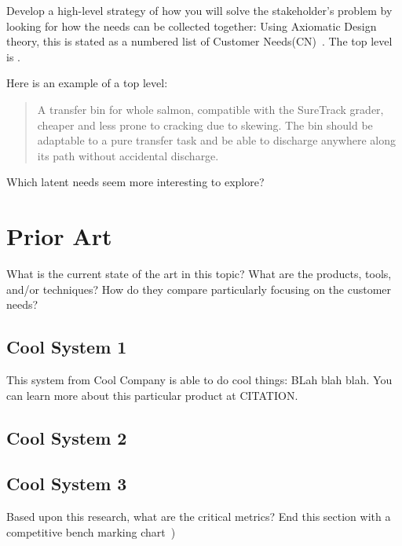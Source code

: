 Develop a high-level strategy of how you will solve the stakeholder's problem by looking for how the needs can be collected together:
Using Axiomatic Design theory, this is stated as a numbered list of Customer Needs(CN)~\cite{suh1990principles}.
The top level is .

Here is an example of a top level:

\begin{quote} \textbf{} A transfer bin for whole salmon, compatible with the SureTrack grader, cheaper and less prone to cracking due to skewing.  
The bin should be adaptable to a pure transfer task and be able to discharge anywhere along its path without
accidental discharge.~\cite{gerhard2016suretrack}
\end{quote}


Which latent needs seem more interesting to explore?

\section{Prior Art}
What is the current state of the art in this topic?
What are the products, tools, and/or techniques?
How do they compare particularly focusing on the customer needs?

\subsection{Cool System 1}
This system from Cool Company is able to do cool things:  BLah blah blah.
You can learn more about this particular product at CITATION.
\subsection{Cool System 2}
\subsection{Cool System 3}

Based upon this research, what are the critical metrics?
End this section with a competitive bench marking chart~\cite[p.104]{ulrich2020product-design-development})

